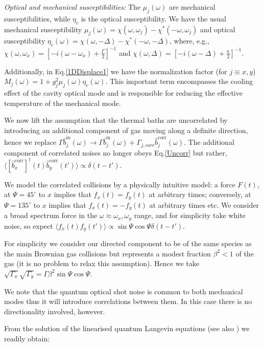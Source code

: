 \documentclass[twocolumn,english,notitlepage,superscriptaddress,nofootinbib]{revtex4-2}
\begin{document}
{\em Optical and mechanical susceptibilities:} The $\mu_{j}(\omega)$ are mechanical susceptibilities, while $\eta_c$ is the optical susceptibility. We have the usual mechanical susceptibility $\mu_j(\omega)=\chi(\omega,\omega_j)-\chi^*(-\omega,\omega_j)$ and optical susceptibility  $\eta_c(\omega)=\chi(\omega,-\Delta)-\chi^*(-\omega,-\Delta)$, where, e.g., $\chi(\omega,\omega_x)=[-i(\omega-\omega_x)+\frac{\Gamma}{2}]^{-1}$ and $\chi(\omega,\Delta)=[-i(\omega-\Delta)+\frac{\kappa}{2}]^{-1}$.

Additionally,  in Eq.\ref{1DDisplace1}  we have the normalization factor (for $j\equiv x,y$)
$M_{j}(\omega)=1+g_{j}^{2}\mu_{j}(\omega)\eta_c(\omega)$.  This important term encompasses the cooling effect of the cavity optical mode
and is responsible for reducing the effective temperature of the mechanical mode.

We now lift the assumption that the thermal baths are uncorrelated by introducing an additional component of gas moving along a definite direction, hence we replace $ \Gamma\hat{b}_{j}^{\text{in}}(\omega)\to  \Gamma  \hat{b}_{j}^{\text{in}}(\omega)+ \Gamma_{j,corr} \hat{b}_{j}^{\text{corr}}(\omega)$. The additional component of correlated noises no longer obeys Eq.\ref{Uncorr} but rather, $ \langle  [\hat{b}_x^{\text{corr}}]^\dagger(t) \hat{b}_y^{\text{corr}}(t')\rangle  \propto \delta(t-t')$.

We model the correlated collisions by a physically intuitive model: a force $F(t)$, at $\Psi=45^\circ$  to $x$ implies that $ f_x(t)=f_y(t)$ at arbitrary times; conversely, at $\Psi=135^\circ$  to $x$
implies that $ f_x(t)=-f_y(t)$ at arbitrary times etc. We consider a broad spectrum force in the $\omega \approx \omega_x,\omega_y$ range, and for simplicity take white noise, so expect $ \langle  f_x (t) f_y(t')\rangle  \propto \sin \Psi \cos \Psi \delta(t-t')$.

For simplicity we consider our directed component to be of the same species as the main Brownian gas collisions but represents a modest fraction $\beta^2 <1 $ of the gas (it is no problem to relax this assumption).  Hence we take $\sqrt{ \Gamma_{x}} \sqrt{\Gamma_{y}} =\Gamma \beta^2  \sin \Psi \cos \Psi$.

We note that the quantum optical shot noise is common to both mechanical modes thus it will introduce correlations between them.  In this case there is no directionality involved, however.  

From the solution of the linearised quantum Langevin equations  (see also \cite{MTTM2020}) we readily obtain:
\end{document}
